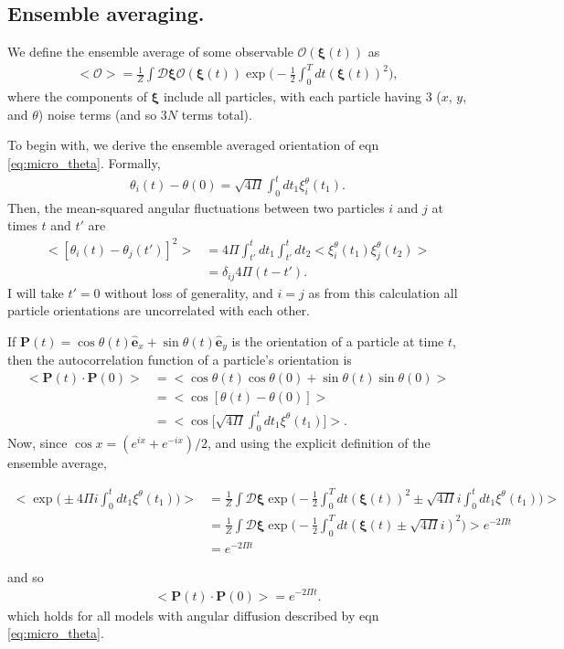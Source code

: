 \documentclass[twocolumn,amsmath,amssymb,aps]{revtex4-1}%
\begin{document}
\subsection{Ensemble averaging.}
We define the ensemble average of some observable $\mathcal{O}(\bm{\xi}(t))$
as
\begin{align}
  <\mathcal{O}>=\frac{1}{Z}\int \mathcal{D}\bm{\xi}
  \mathcal{O}(\bm{\xi}(t))
  \exp\bigg(-\frac{1}{2}\int_0^Tdt(\bm{\xi}(t))^2\bigg),
\end{align}
where the components of $\bm{\xi}$ include all particles, with each particle
having $3$ ($x$, $y$, and $\theta$) noise terms (and so $3N$ terms total).

To begin with, we derive the ensemble averaged orientation of eqn
\ref{eq:micro_theta}. Formally,
\begin{align}
  \theta_i(t)-\theta(0)=\sqrt{4\Pi}\int_0^tdt_1\xi_i^{\theta}(t_1).
\end{align}
Then, the mean-squared angular fluctuations between two particles $i$
and $j$ at times $t$ and $t'$ are
\begin{align}
  <[\theta_i(t)-\theta_j(t')]^2>
  &= 4\Pi\int_{t'}^tdt_1\int_{t'}^tdt_2
  <\xi_i^{\theta}(t_1)\xi_j^{\theta}(t_2)>\nonumber\\
  &= \delta_{ij}4\Pi(t-t').
\end{align}
I will take $t'=0$ without loss of generality, and $i=j$ as from this
calculation all particle orientations are uncorrelated with each other.

If $\bm{P}(t)=\cos\theta(t)\bm{\hat{e}}_x+\sin\theta(t)\bm{\hat{e}}_y$
is the orientation of a particle at time $t$, then the autocorrelation
function of a particle's orientation is
\begin{align}
  <\bm{P}(t)\cdot\bm{P}(0)>
  &=<\cos\theta(t)\cos\theta(0)+\sin\theta(t)\sin\theta(0)>
  \nonumber\\
  &=<\cos[\theta(t)-\theta(0)]>\nonumber\\
  &=\bigg<\cos\bigg[\sqrt{4\Pi}\int_0^tdt_1\xi^{\theta}(t_1)\bigg]\bigg>.
\end{align}
Now, since $\cos x = (e^{ix}+e^{-ix})/2$, and using the explicit
definition of the ensemble average,
\begin{widetext}
  \begin{align}
    \bigg<\exp\bigg(\pm 4\Pi i\int_0^tdt_1\xi^{\theta}(t_1)\bigg)\bigg>
    &=\frac{1}{Z}\int \mathcal{D}\bm{\xi}
    \exp\bigg(-\frac{1}{2}\int_0^Tdt(\bm{\xi}(t))^2
    \pm \sqrt{4\Pi} i\int_0^tdt_1\xi^{\theta}(t_1)\bigg)\bigg>
    \nonumber\\
    &=\frac{1}{Z}\int \mathcal{D}\bm{\xi}
    \exp\bigg(-\frac{1}{2}\int_0^Tdt(\bm{\xi}(t)\pm\sqrt{4\Pi}i)^2
    \bigg)\bigg>e^{-2\Pi t}\nonumber\\
    &=e^{-2\Pi t}
  \end{align}
\end{widetext}
and so
\begin{align}
  <\bm{P}(t)\cdot\bm{P}(0)>=e^{-2\Pi t}.
\end{align}
which holds for all models with angular diffusion described by eqn
\ref{eq:micro_theta}.
\end{document}
